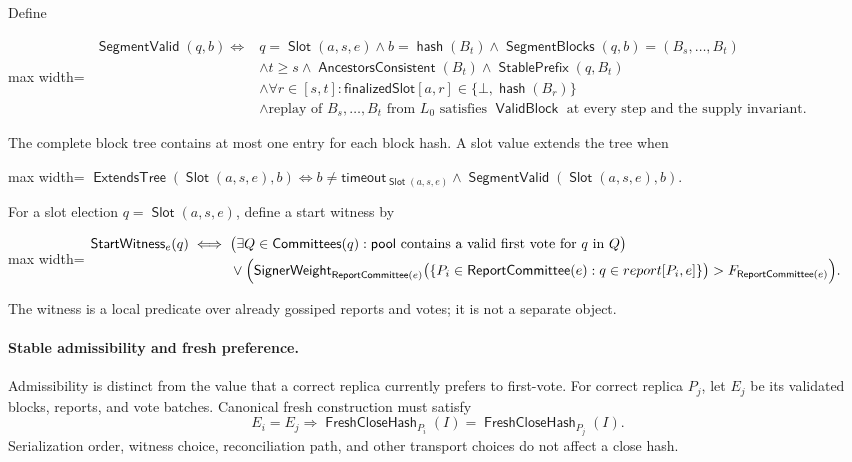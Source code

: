 \documentclass[sigplan,twocolumn,review,anonymous]{acmart}
\newcommand{\func}[1]{\operatorname{\mathsf{#1}}}
\newcommand{\hash}{\func{hash}}
\newcommand{\Slot}{\func{Slot}}
\newcommand{\SegmentBlocks}{\func{SegmentBlocks}}
\newcommand{\SegmentValid}{\func{SegmentValid}}
\newcommand{\ReportCommittee}{\func{ReportCommittee}}
\newcommand{\FreshCloseHash}{\func{FreshCloseHash}}
\newcommand{\ExtendsTree}{\func{ExtendsTree}}
\newcommand{\timeoutVal}{\mathsf{timeout}}
\newcommand{\ValidBlock}{\func{ValidBlock}}
\newcommand{\finalizedSlot}{\mathsf{finalizedSlot}}
\newcommand{\Committees}{\func{Committees}}
\newcommand{\StablePrefix}{\func{StablePrefix}}
\newcommand{\SignerWeight}{\func{SignerWeight}}
\begin{document}
Define
\begin{center}
\begin{adjustbox}{max width=\columnwidth}
\(\displaystyle
\begin{aligned}
\SegmentValid(q,b)\iff{}&q=\Slot(a,s,e)\wedge b=\hash(B_t)\wedge
\SegmentBlocks(q,b)=(B_s,\ldots,B_t)\\
&\wedge t\ge s\wedge\func{AncestorsConsistent}(B_t)\wedge\StablePrefix(q,B_t)\\
&\wedge\forall r\in[s,t]:\finalizedSlot[a,r]\in\{\bot,\hash(B_r)\}\\
&\wedge\text{replay of }B_s,\ldots,B_t\text{ from }L_0\text{ satisfies }\ValidBlock
\text{ at every step and the supply invariant}.
\end{aligned}
\)
\end{adjustbox}
\end{center}
The complete block tree contains at most one entry for each block hash.  A slot value extends the tree
when
\begin{center}
\begin{adjustbox}{max width=\columnwidth}
\(\displaystyle
\ExtendsTree(\Slot(a,s,e),b)\iff
b\neq\timeoutVal_{\Slot(a,s,e)}\wedge\SegmentValid(\Slot(a,s,e),b).
\)
\end{adjustbox}
\end{center}
For a slot election \(q=\Slot(a,s,e)\), define a start witness by
\begin{center}
\begin{adjustbox}{max width=\columnwidth}
\(\displaystyle
\begin{aligned}
\func{StartWitness}_e(q)\iff{}&
\bigl(\exists Q\in\Committees(q):\mathsf{pool}\text{ contains a valid first vote for }q\text{ in }Q\bigr)\\
&\vee\Bigl(\SignerWeight_{\ReportCommittee(e)}
\bigl(\{P_i\in\ReportCommittee(e):q\in report[P_i,e]\}\bigr)>F_{\ReportCommittee(e)}\Bigr).
\end{aligned}
\)
\end{adjustbox}
\end{center}
The witness is a local predicate over already gossiped reports and votes; it is not a separate object.

\paragraph{Stable admissibility and fresh preference.}
Admissibility is distinct from the value that a correct replica currently prefers to first-vote.  For
correct replica \(P_j\), let \(E_j\) be its validated blocks, reports, and vote batches.  Canonical fresh
construction must satisfy
\[
E_i=E_j
\Longrightarrow
\FreshCloseHash_{P_i}(I)=\FreshCloseHash_{P_j}(I).
\]
Serialization order, witness choice, reconciliation path, and other transport choices do not affect a
close hash.
\end{document}
